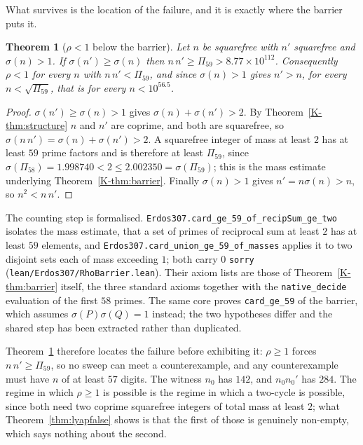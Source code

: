\documentclass[11pt]{article}
\newtheorem{theorem}{Theorem}[section]
\theoremstyle{definition}
\begin{document}
What survives is the location of the failure, and it is exactly where the barrier puts it.

\begin{theorem}[$\rho<1$ below the barrier]\label{thm:rhobarrier}
Let $n$ be squarefree with $n'$ squarefree and $\sigma(n)>1$. If $\sigma(n')\ge\sigma(n)$ then
$n\,n'\ge\Pi_{59}>8.77\times10^{112}$. Consequently $\rho<1$ for every $n$ with
$n\,n'<\Pi_{59}$, and since $\sigma(n)>1$ gives $n'>n$, for every $n<\sqrt{\Pi_{59}}$, that is for
every $n<10^{56.5}$.
\end{theorem}
\begin{proof}
$\sigma(n')\ge\sigma(n)>1$ gives $\sigma(n)+\sigma(n')>2$. By Theorem~\ref{K-thm:structure} $n$ and
$n'$ are coprime, and both are squarefree, so $\sigma(n\,n')=\sigma(n)+\sigma(n')>2$. A squarefree
integer of mass at least $2$ has at least $59$ prime factors and is therefore at least $\Pi_{59}$,
since $\sigma(\Pi_{58})=1.998740<2\le2.002350=\sigma(\Pi_{59})$; this is the mass estimate
underlying Theorem~\ref{K-thm:barrier}. Finally $\sigma(n)>1$ gives $n'=n\sigma(n)>n$, so
$n^2<n\,n'$.
\end{proof}

The counting step is formalised. \texttt{Erdos307.card\_ge\_59\_of\_recipSum\_ge\_two} isolates the
mass estimate, that a set of primes of reciprocal sum at least $2$ has at least $59$ elements, and
\texttt{Erdos307.card\_union\_ge\_59\_of\_masses} applies it to two disjoint sets each of mass
exceeding $1$; both carry $0$ \texttt{sorry}
\textup{(\texttt{lean/Erdos307/RhoBarrier.lean})}. Their axiom lists are those of
Theorem~\ref{K-thm:barrier} itself, the three standard axioms together with the
\texttt{native\_decide} evaluation of the first $58$ primes. The same core proves
\texttt{card\_ge\_59} of the barrier, which assumes $\sigma(P)\sigma(Q)=1$ instead; the two
hypotheses differ and the shared step has been extracted rather than duplicated.

Theorem~\ref{thm:rhobarrier} therefore locates the failure before exhibiting it: $\rho\ge1$ forces
$n\,n'\ge\Pi_{59}$, so no sweep can meet a counterexample, and any counterexample must have $n$ of
at least $57$ digits. The witness $n_0$ has $142$, and $n_0n_0'$ has $284$. The regime in which
$\rho\ge1$ is possible is the regime in which a two-cycle is possible, since both need two coprime
squarefree integers of total mass at least $2$; what Theorem~\ref{thm:lyapfalse} shows is that the
first of those is genuinely non-empty, which says nothing about the second.
\end{document}
